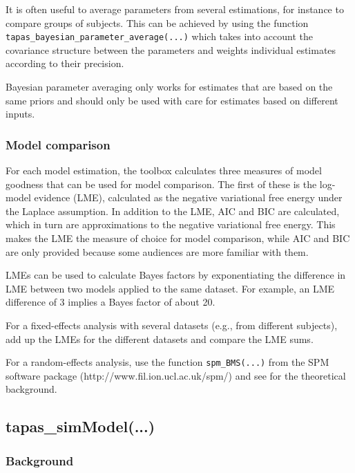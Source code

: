 \documentclass[11pt,a4paper]{article}
\numberwithin{equation}{section}
\begin{document}
It is often useful to average parameters from several estimations, for
instance to compare groups of subjects. This can be achieved by using
the function
\linebreak\texttt{tapas\_bayesian\_parameter\_average(...)} which
takes into account the covariance \linebreak structure between the
parameters and weights individual estimates according to their
precision.

Bayesian parameter averaging only works for estimates that are based
on the same priors and should only be used with care for estimates
based on different inputs.

\subsubsection{Model comparison}

For each model estimation, the toolbox calculates three measures
of model goodness that can be used for model comparison. The first of
these is the log-model evidence (LME), calculated as the negative
variational free energy under the Laplace assumption. In addition to
the LME, AIC and BIC are calculated, which in turn are approximations
to the negative variational free energy. This makes the LME the
measure of choice for model comparison, while AIC and BIC are only
provided because some audiences are more familiar with them.

LMEs can be used to calculate Bayes factors by exponentiating the
difference in LME between two models applied to the same dataset.  For
example, an LME difference of 3 implies a Bayes factor of about 20.

For a fixed-effects analysis with several datasets (e.g., from
different subjects), add up the LMEs for the different datasets and
compare the LME sums.

For a random-effects analysis, use the function \texttt{spm\_BMS(...)}
from the SPM software package (http://www.fil.ion.ucl.ac.uk/spm/) and
see \citet{stephan_bayesian_2009} for the theoretical
background.


\subsection{tapas\_simModel(...)}
\label{sec:simmodel}

\subsubsection{Background}
\end{document}
